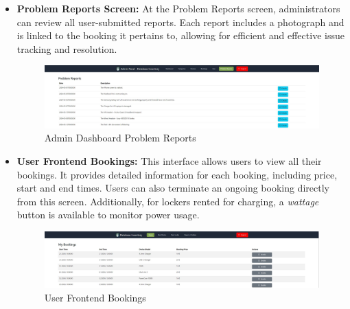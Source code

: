 \begin{itemize}
\item \textbf {Problem Reports Screen: }At the Problem Reports screen, administrators can review all user-submitted reports. Each report includes a photograph and is linked to the booking it pertains to, allowing for efficient and effective issue tracking and resolution.
\begin{figure}[h]
    \centering
    \includegraphics[width=1\linewidth]{images/problem reports.JPG}
    \caption{Admin Dashboard Problem Reports}
    \label{fig:problem-reports-dashboard}
\end{figure}
\newpage
\item \textbf{User Frontend Bookings: } This interface allows users to view all their bookings. It provides detailed information for each booking, including price, start and end times. Users can also terminate an ongoing booking directly from this screen. Additionally, for lockers rented for charging, a \textit{wattage} button is available to monitor power usage.
\begin{figure}[h]
    \centering
    \includegraphics[width=1\linewidth]{images/bookings.JPG}
    \caption{User Frontend Bookings}
    \label{fig:user-bookings-dashboard}
\end{figure}


\end{itemize}

